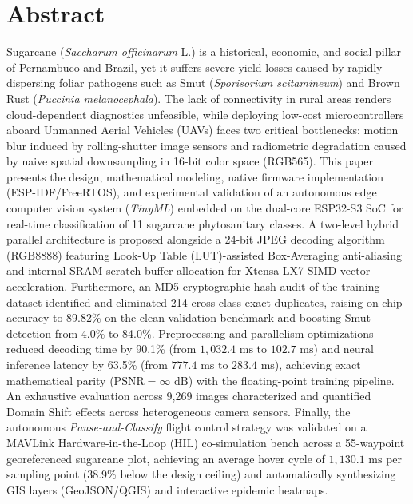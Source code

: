 \documentclass[12pt]{article}
\begin{document}

\section*{Abstract}
Sugarcane (\textit{Saccharum officinarum} L.) is a historical, economic, and social pillar of Pernambuco and Brazil, yet it suffers severe yield losses caused by rapidly dispersing foliar pathogens such as Smut (\textit{Sporisorium scitamineum}) and Brown Rust (\textit{Puccinia melanocephala}). The lack of connectivity in rural areas renders cloud-dependent diagnostics unfeasible, while deploying low-cost microcontrollers aboard Unmanned Aerial Vehicles (UAVs) faces two critical bottlenecks: motion blur induced by rolling-shutter image sensors and radiometric degradation caused by naive spatial downsampling in 16-bit color space (RGB565). This paper presents the design, mathematical modeling, native firmware implementation (ESP-IDF/FreeRTOS), and experimental validation of an autonomous edge computer vision system (\textit{TinyML}) embedded on the dual-core ESP32-S3 SoC for real-time classification of 11 sugarcane phytosanitary classes. A two-level hybrid parallel architecture is proposed alongside a 24-bit JPEG decoding algorithm (RGB8888) featuring Look-Up Table (LUT)-assisted Box-Averaging anti-aliasing and internal SRAM scratch buffer allocation for Xtensa LX7 SIMD vector acceleration. Furthermore, an MD5 cryptographic hash audit of the training dataset identified and eliminated 214 cross-class exact duplicates, raising on-chip accuracy to 89.82\% on the clean validation benchmark and boosting Smut detection from 4.0\% to 84.0\%. Preprocessing and parallelism optimizations reduced decoding time by 90.1\% (from $1,032.4\text{ ms}$ to $102.7\text{ ms}$) and neural inference latency by 63.5\% (from $777.4\text{ ms}$ to $283.4\text{ ms}$), achieving exact mathematical parity ($\text{PSNR} = \infty\text{ dB}$) with the floating-point training pipeline. An exhaustive evaluation across 9,269 images characterized and quantified Domain Shift effects across heterogeneous camera sensors. Finally, the autonomous \textit{Pause-and-Classify} flight control strategy was validated on a MAVLink Hardware-in-the-Loop (HIL) co-simulation bench across a 55-waypoint georeferenced sugarcane plot, achieving an average hover cycle of $1,130.1\text{ ms}$ per sampling point (38.9\% below the design ceiling) and automatically synthesizing GIS layers (GeoJSON/QGIS) and interactive epidemic heatmaps.
\end{document}
